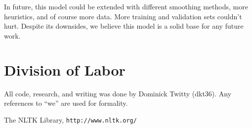 \documentclass[12pt]{article}
\begin{document}
In future, this model could be extended with different smoothing methods, more heuristics, and of course more data. More training and validation sets couldn't hurt. Despite its downsides, we believe this model is a solid base for any future work.



\section{Division of Labor}
All code, research, and writing was done by Dominick Twitty (dkt36). Any references to ``we'' are used for formality. 

\begin{thebibliography}{1}
 The NLTK Library, 
\verb|http://www.nltk.org/|
\end{thebibliography}
\end{document}
